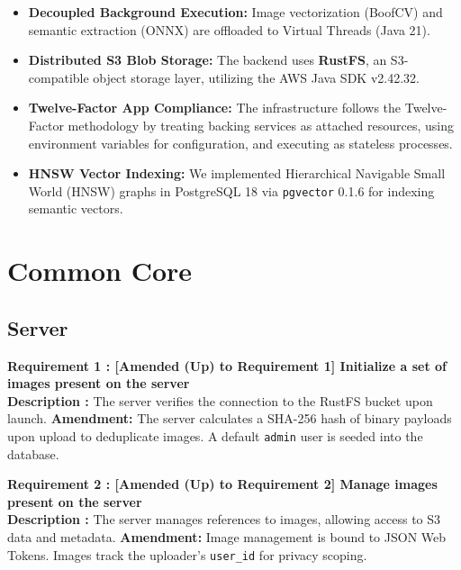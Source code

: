 \documentclass[12pt, a4paper]{article}
\begin{document}
\begin{itemize}
    \item \textbf{Decoupled Background Execution:} Image vectorization (BoofCV) and semantic extraction (ONNX) are offloaded to Virtual Threads (Java 21).
    \item \textbf{Distributed S3 Blob Storage:} The backend uses \textbf{RustFS}, an S3-compatible object storage layer, utilizing the AWS Java SDK v2.42.32.
    \item \textbf{Twelve-Factor App Compliance:} The infrastructure follows the Twelve-Factor methodology by treating backing services as attached resources, using environment variables for configuration, and executing as stateless processes.
    \item \textbf{HNSW Vector Indexing:} We implemented Hierarchical Navigable Small World (HNSW) graphs in PostgreSQL 18 via \texttt{pgvector} 0.1.6 for indexing semantic vectors.
\end{itemize}

\clearpage

\section{Common Core}

\subsection*{Server}

\noindent\textbf{Requirement 1 : [Amended (Up) to Requirement 1] Initialize a set of images present on the server}\\
\textbf{Description :} The server verifies the connection to the RustFS bucket upon launch. \textbf{Amendment:} The server calculates a SHA-256 hash of binary payloads upon upload to deduplicate images. A default \texttt{admin} user is seeded into the database.
\vspace{1em}

\noindent\textbf{Requirement 2 : [Amended (Up) to Requirement 2] Manage images present on the server}\\
\textbf{Description :} The server manages references to images, allowing access to S3 data and metadata. \textbf{Amendment:} Image management is bound to JSON Web Tokens. Images track the uploader's \texttt{user\_id} for privacy scoping.
\vspace{1em}
\end{document}
